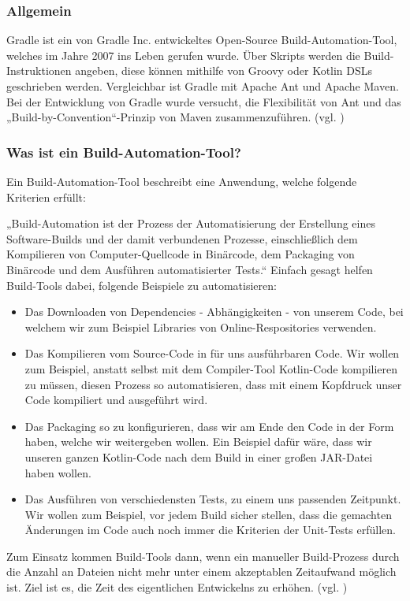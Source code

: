 \subsubsection{Allgemein}
Gradle ist ein von Gradle Inc. entwickeltes Open-Source Build-Automation-Tool, welches im Jahre 2007 ins Leben gerufen wurde. Über Skripts werden die Build-Instruktionen angeben, diese können mithilfe von Groovy oder Kotlin DSLs geschrieben werden.
Vergleichbar ist Gradle mit Apache Ant und Apache Maven. Bei der Entwicklung von Gradle wurde versucht, die Flexibilität von Ant und das „Build-by-Convention“-Prinzip von Maven zusammenzuführen.
(vgl. \cite{Gradle-Background})
\subsubsection{Was ist ein Build-Automation-Tool?}
Ein Build-Automation-Tool beschreibt eine Anwendung, welche folgende Kriterien erfüllt: 
\vspace{1mm}\par
„Build-Automation ist der Prozess der Automatisierung der Erstellung eines Software-Builds und der damit verbundenen Prozesse, einschließlich dem Kompilieren von Computer-Quellcode in Binärcode, dem Packaging von Binärcode und dem Ausführen automatisierter Tests.“ \cite{Build-Automation}
\newpage
Einfach gesagt helfen Build-Tools dabei, folgende Beispiele zu automatisieren: 
\begin{itemize}
  \item Das Downloaden von Dependencies - Abhängigkeiten - von unserem Code, bei welchem wir zum Beispiel Libraries von Online-Respositories verwenden.
  \item Das Kompilieren vom Source-Code in für uns ausführbaren Code. Wir wollen zum Beispiel, anstatt selbst mit dem Compiler-Tool Kotlin-Code kompilieren zu müssen, diesen Prozess so automatisieren, dass mit einem Kopfdruck unser Code kompiliert und ausgeführt wird.
  \item Das Packaging so zu konfigurieren, dass wir am Ende den Code in der Form haben, welche wir weitergeben wollen. Ein Beispiel dafür wäre, dass wir unseren ganzen Kotlin-Code nach dem Build in einer großen JAR-Datei haben wollen.
  \item Das Ausführen von verschiedensten Tests, zu einem uns passenden Zeitpunkt. Wir wollen zum Beispiel, vor jedem Build sicher stellen, dass die gemachten Änderungen im Code auch noch immer die Kriterien der Unit-Tests erfüllen.
\end{itemize}
Zum Einsatz kommen Build-Tools dann, wenn ein manueller Build-Prozess durch die Anzahl an Dateien nicht mehr unter einem akzeptablen Zeitaufwand möglich ist. Ziel ist es, die Zeit des eigentlichen Entwickelns zu erhöhen.
(vgl. \cite{Gradle-Choice})
\newpage
